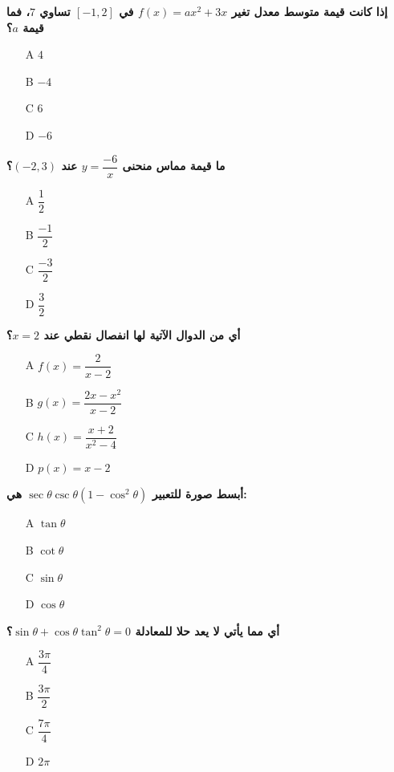 \documentclass{article}
\begin{document}
\textbf{إذا كانت قيمة متوسط معدل تغير $f(x) = ax^2 + 3x$ في $[-1, 2]$ تساوي $7$، فما قيمة $a$؟}
\begin{enumerate}
    \item[A] $4$
    \item[B] $-4$
    \item[C] $6$
    \item[D] $-6$
\end{enumerate}

\textbf{ما قيمة مماس منحنى $y = \dfrac{-6}{x}$ عند $(-2, 3)$؟}
\begin{enumerate}
    \item[A] $\dfrac{1}{2}$
    \item[B] $\dfrac{-1}{2}$
    \item[C] $\dfrac{-3}{2}$
    \item[D] $\dfrac{3}{2}$
\end{enumerate}

\textbf{أي من الدوال الآتية لها انفصال نقطي عند $x = 2$؟}
\begin{enumerate}
    \item[A] $f(x) = \dfrac{2}{x - 2}$
    \item[B] $g(x) = \dfrac{2x - x^2}{x - 2}$
    \item[C] $h(x) = \dfrac{x + 2}{x^2 - 4}$
    \item[D] $p(x) = x - 2$
\end{enumerate}

\textbf{أبسط صورة للتعبير $\sec\theta\csc\theta\left(1-\cos^2\theta\right)$ هي:}
\begin{enumerate}
    \item[A] $\tan\theta$
    \item[B] $\cot\theta$
    \item[C] $\sin\theta$
    \item[D] $\cos\theta$
\end{enumerate}

\textbf{أي مما يأتي لا يعد حلا للمعادلة $\sin\theta + \cos\theta\tan^2\theta = 0$؟}
\begin{enumerate}
    \item[A] $\dfrac{3\pi}{4}$
    \item[B] $\dfrac{3\pi}{2}$
    \item[C] $\dfrac{7\pi}{4}$
    \item[D] $2\pi$
\end{enumerate}
\end{document}
